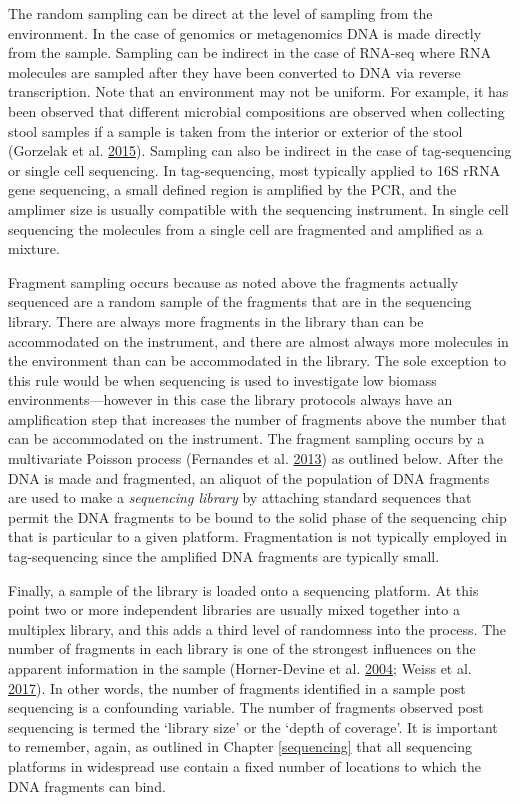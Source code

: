 \documentclass[onecolumn]{book}
\theoremstyle{definition}
\theoremstyle{definition}
\theoremstyle{definition}
\theoremstyle{remark}
\begin{document}
The random sampling can be direct at the level of sampling from the
environment. In the case of genomics or metagenomics DNA is made
directly from the sample. Sampling can be indirect in the case of
RNA-seq where RNA molecules are sampled after they have been converted
to DNA via reverse transcription. Note that an environment may not be
uniform. For example, it has been observed that different microbial
compositions are observed when collecting stool samples if a sample is
taken from the interior or exterior of the stool (Gorzelak et al.
\protect\hyperlink{ref-Gorzelak:2015aa}{2015}). Sampling can also be
indirect in the case of tag-sequencing or single cell sequencing. In
tag-sequencing, most typically applied to 16S rRNA gene sequencing, a
small defined region is amplified by the PCR, and the amplimer size is
usually compatible with the sequencing instrument. In single cell
sequencing the molecules from a single cell are fragmented and amplified
as a mixture.

Fragment sampling occurs because as noted above the fragments actually
sequenced are a random sample of the fragments that are in the
sequencing library. There are always more fragments in the library than
can be accommodated on the instrument, and there are almost always more
molecules in the environment than can be accommodated in the library.
The sole exception to this rule would be when sequencing is used to
investigate low biomass environments---however in this case the library
protocols always have an amplification step that increases the number of
fragments above the number that can be accommodated on the instrument.
The fragment sampling occurs by a multivariate Poisson process
(Fernandes et al. \protect\hyperlink{ref-fernandes:2013}{2013}) as
outlined below. After the DNA is made and fragmented, an aliquot of the
population of DNA fragments are used to make a \emph{sequencing library}
by attaching standard sequences that permit the DNA fragments to be
bound to the solid phase of the sequencing chip that is particular to a
given platform. Fragmentation is not typically employed in
tag-sequencing since the amplified DNA fragments are typically small.

Finally, a sample of the library is loaded onto a sequencing platform.
At this point two or more independent libraries are usually mixed
together into a multiplex library, and this adds a third level of
randomness into the process. The number of fragments in each library is
one of the strongest influences on the apparent information in the
sample (Horner-Devine et al.
\protect\hyperlink{ref-Horner-Devine:2004aa}{2004}; Weiss et al.
\protect\hyperlink{ref-Weiss:2017aa}{2017}). In other words, the number
of fragments identified in a sample post sequencing is a confounding
variable. The number of fragments observed post sequencing is termed the
`library size' or the `depth of coverage'. It is important to remember,
again, as outlined in Chapter \ref{sequencing} that all sequencing
platforms in widespread use contain a fixed number of locations to which
the DNA fragments can bind.
\end{document}
